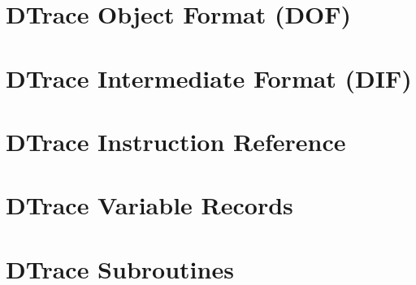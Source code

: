 \chapter{DTrace Object Format (DOF)}
\label{chap:dtrace-object-format}


\chapter{DTrace Intermediate Format (DIF)}
\label{chap:dtrace-intermediate-format}


\chapter{DTrace Instruction Reference}
\label{chap:dtrace-instruction-reference}


\chapter{DTrace Variable Records}
\label{chap:dtrace-variable-records}


\chapter{DTrace Subroutines}
\label{chap:dtrace-subroutines}







